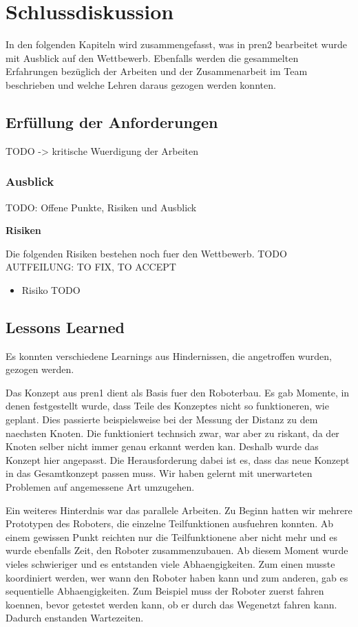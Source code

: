 \section{Schlussdiskussion}

In den folgenden Kapiteln wird zusammengefasst, was in \acrshort{pren2} bearbeitet wurde mit Ausblick auf den Wettbewerb.
Ebenfalls werden die gesammelten Erfahrungen bezüglich der Arbeiten und der Zusammenarbeit im Team beschrieben und welche Lehren daraus gezogen werden konnten.

\subsection{Erfüllung der Anforderungen}

TODO ->  kritische Wuerdigung der Arbeiten

\subsubsection{Ausblick}

TODO: Offene Punkte, Risiken und Ausblick

\textbf{Risiken}

Die folgenden Risiken bestehen noch fuer den Wettbewerb. TODO AUTFEILUNG: TO FIX, TO ACCEPT

\begin{itemize}
    \item Risiko TODO
\end{itemize}



\subsection{Lessons Learned}

Es konnten verschiedene Learnings aus Hindernissen, die angetroffen wurden, gezogen werden.

Das Konzept aus \acrshort{pren1} dient als Basis fuer den Roboterbau. Es gab Momente, in denen festgestellt wurde, dass Teile des Konzeptes nicht so funktioneren, wie geplant. Dies passierte beispielsweise bei der Messung der Distanz zu dem naechsten Knoten. Die funktioniert technsich zwar, war aber zu riskant, da der Knoten selber nicht immer genau erkannt werden kan. Deshalb wurde das Konzept hier angepasst. Die Herausforderung dabei ist es, dass das neue Konzept in das Gesamtkonzept passen muss. Wir haben gelernt mit unerwarteten Problemen auf angemessene Art umzugehen.

Ein weiteres Hinterdnis war das parallele Arbeiten. Zu Beginn hatten wir mehrere Prototypen des Roboters, die einzelne Teilfunktionen ausfuehren konnten. Ab einem gewissen Punkt reichten nur die Teilfunktionene aber nicht mehr und es wurde ebenfalls Zeit, den Roboter zusammenzubauen. Ab diesem Moment wurde vieles schwieriger und es entstanden viele Abhaengigkeiten. Zum einen musste koordiniert werden, wer wann den Roboter haben kann und zum anderen, gab es sequentielle Abhaengigkeiten. Zum Beispiel muss der Roboter zuerst fahren koennen, bevor getestet werden kann, ob er durch das Wegenetzt fahren kann. Dadurch enstanden Wartezeiten.
